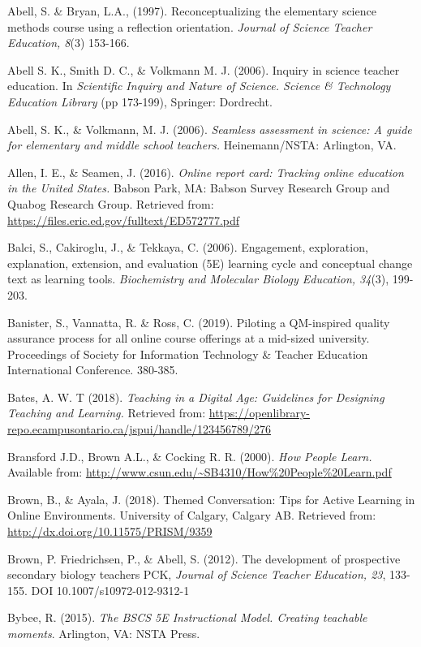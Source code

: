 \documentclass[11.5pt]{sig-alternate} %
\begin{document}
\leftskip 0.25in
\parindent -0.25in

Abell, S. \& Bryan, L.A., (1997). Reconceptualizing the elementary science methods course using a reflection orientation. \textit{Journal of Science Teacher Education, 8}(3) 153-166.

Abell S. K., Smith D. C., \& Volkmann M. J. (2006). Inquiry in science teacher education. In \textit{Scientific Inquiry and Nature of Science. Science \& Technology Education Library} (pp 173-199), Springer: Dordrecht.

Abell, S. K., \& Volkmann, M. J. (2006). \textit{Seamless assessment in science: A guide for elementary and middle school teachers.} Heinemann/NSTA: Arlington, VA.

Allen, I. E., \& Seamen, J. (2016). \textit{Online report card: Tracking online education in the United States.} Babson Park, MA: Babson Survey Research Group and Quabog Research Group. Retrieved from: \url{https://files.eric.ed.gov/fulltext/ED572777.pdf}

Balci, S., Cakiroglu, J., \& Tekkaya, C. (2006). Engagement, exploration, explanation, extension, and evaluation (5E) learning cycle and conceptual change text as learning tools. \textit{Biochemistry and Molecular Biology Education, 34}(3), 199-203.

Banister, S., Vannatta, R. \& Ross, C. (2019). Piloting a QM-inspired quality assurance process for all online course offerings at a mid-sized university. Proceedings of Society for Information Technology \& Teacher Education International Conference. 380-385.

Bates, A. W. T (2018). \textit{Teaching in a Digital Age: Guidelines for Designing Teaching and Learning.} Retrieved from: \url{https://openlibrary-repo.ecampusontario.ca/jspui/handle/123456789/276}

Bransford J.D., Brown A.L., \& Cocking R. R. (2000). \textit{How People Learn.} Available from: \url{http://www.csun.edu/~SB4310/How\%20People\%20Learn.pdf}

Brown, B., \& Ayala, J. (2018). Themed Conversation: Tips for Active Learning in Online Environments. University of Calgary, Calgary AB. Retrieved from: \url{http://dx.doi.org/10.11575/PRISM/9359}

Brown, P. Friedrichsen, P., \& Abell, S. (2012). The development of prospective secondary biology teachers PCK, \textit{Journal of Science Teacher Education, 23}, 133-155. DOI 10.1007/s10972-012-9312-1

Bybee, R. (2015).  \textit{The BSCS 5E Instructional Model. Creating teachable moments}. Arlington, VA: NSTA Press.
\end{document}
